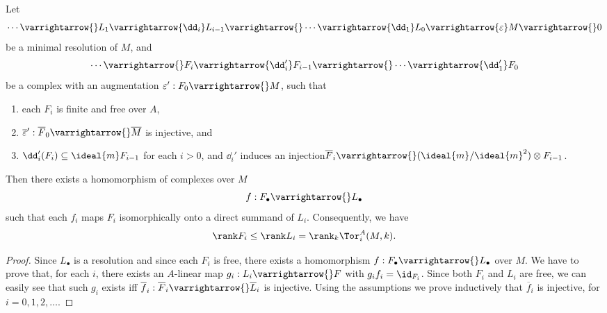 \documentclass[../main]{subfiles}
\begin{document}
\begin{lemma}\label{lem:18.09} Let \[\cdots\varrightarrow{} L_{1} \varrightarrow{\dd_{i}} L_{i-1}\varrightarrow{}\cdots \varrightarrow{\dd_{1}} L_{0}\varrightarrow{\varepsilon}M \varrightarrow{} 0\] be a minimal resolution of $M$, and
\[
\cdots \varrightarrow{} F_{i} \varrightarrow{\dd_{i}'} F_{i-1} \varrightarrow{} \cdots \varrightarrow{\dd_1'} F_{0}
\]
be a complex with an augmentation $\varepsilon': F_{0} \varrightarrow{} M$, such that
\begin{enumerate}[label = \roman*)]
    \item each $F_{i}$ is finite and free over $A$,
    \item $\overline{\varepsilon}': \overline{F}_{0} \varrightarrow{} \overline{M}$ is injective, and
    \item $\dd_{i}'(F_{i}) \subseteq \ideal{m} F_{i-1}$ for each $i>0$, and $\dd_{i}'$ induces an injection\newline $\overline{F}_{i} \varrightarrow{}(\ideal{m} / \ideal{m}^{2}) \otimes F_{i-1}$. 
\end{enumerate}
 Then there exists a homomorphism of complexes over $M$
\[
f: F_\bullet \varrightarrow{} L_\bullet
\]
such that each $f_{i}$ maps $F_{i}$ isomorphically onto a direct summand of $L_{i}$. Consequently, we have
\[\rank F_i \leq \rank L_i = \rank_k \Tor_i^A (M,k). \]
\end{lemma}
\begin{proof} Since $L_\bullet$ is a resolution and since each $F_{i}$ is free, there exists a homomorphism $f: F_\bullet \varrightarrow{} L_\bullet$ over $M$. We have to prove that, for each $i$, there exists an $A$-linear map $g_{i}: L_{i}\varrightarrow{} F$ with $g_{i} f_{i}= \id_{F_i}$. Since both $F_{i}$ and $L_{i}$ are free, we can easily see that such $g_{i}$ exists iff $\overline{f}_{i}: \overline{F}_{i}\varrightarrow{}\overline{L}_{i}$ is injective. Using the assumptions we prove inductively that $\overline{f}_{i}$ is injective, for $i=0,1,2, \dots$.
\end{proof}
\end{document}
